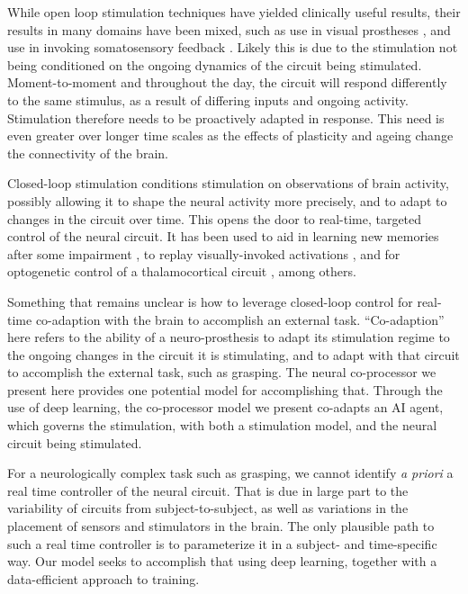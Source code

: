 \documentclass[12pt]{iopart}
\begin{document}
While open loop stimulation techniques have yielded clinically useful results,
their results in many domains have been mixed, such as use in visual
prostheses \cite{bosking.visual}, and use in invoking somatosensory feedback
\cite{cronin.tact}. Likely this is due to the stimulation not being conditioned
on the ongoing dynamics of the circuit being stimulated. Moment-to-moment and
throughout the day, the circuit will respond differently to the same stimulus,
as a result of differing inputs and ongoing activity. Stimulation
therefore needs to be proactively adapted in response. This need is even
greater over longer time scales as the effects of plasticity and ageing change
the connectivity of the brain.

Closed-loop stimulation conditions stimulation on observations of brain activity,
possibly allowing it to shape the neural activity more precisely, and to adapt to changes
in the circuit over time. This opens the door to real-time, targeted control of the neural
circuit. It has been used to aid in learning new memories after some impairment
\cite{berger.closedloop, kahana.biomarker}, to replay visually-invoked
activations \cite{tafazoli.acls}, and for optogenetic control of
a thalamocortical circuit \cite{bolus.opto}, among others.

Something that remains unclear is how to leverage closed-loop control for real-time
co-adaption with the brain to accomplish an external task. ``Co-adaption'' here refers
to the ability of a neuro-prosthesis to adapt its stimulation regime to the ongoing
changes in the circuit it is stimulating, and to adapt with that circuit to accomplish
the external task, such as grasping. The neural co-processor we present here provides one
potential model for accomplishing that. Through the use of deep learning, the
co-processor model we present co-adapts an AI agent, which governs the
stimulation, with both a stimulation model, and the neural circuit being stimulated.

For a neurologically complex task such as grasping, we cannot identify
\textit{a priori} a real time controller of the neural circuit. That is
due in large part to the variability of circuits from subject-to-subject,
as well as variations in the placement of sensors and stimulators in the
brain. The only plausible path to such a real time controller is to parameterize
it in a subject- and time-specific way. Our model seeks to accomplish that using
deep learning, together with a data-efficient approach to training.
\end{document}
